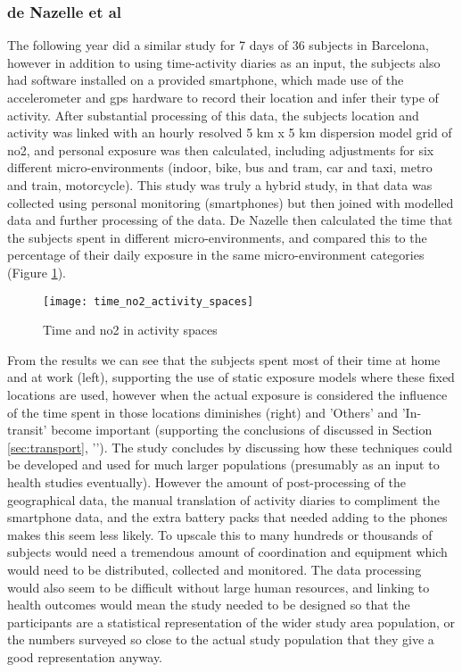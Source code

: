 
\subsubsection{de Nazelle et al}
\label{sec:dynamic_models_denazelle}

The following year \cite{DeNazelle2013} did a similar study for 7 days of 36 subjects in Barcelona, however in addition to using time-activity diaries as an input, the subjects also had software installed on a provided smartphone, which made use of the accelerometer and \gls{gps} hardware to record their location and infer their type of activity. After substantial processing of this data, the subjects location and activity was linked with an hourly resolved 5 km x 5 km dispersion model grid of \gls{no2}, and personal exposure was then calculated, including adjustments for six different micro-environments (indoor, bike, bus and tram, car and taxi, metro and train, motorcycle). This study was truly a hybrid study, in that data was collected using personal monitoring (smartphones) but then joined with modelled data and further processing of the data. De Nazelle then calculated the time that the subjects spent in different micro-environments, and compared this to the percentage of their daily exposure in the same micro-environment categories (Figure \ref{fig:time_no2_activity_spaces}).

\begin{figure}[H]
\centering
\texttt{[image: time\_no2\_activity\_spaces]}
\caption{Time and \gls{no2} in activity spaces}
\label{fig:time_no2_activity_spaces}
\end{figure}

From the results we can see that the subjects spent most of their time at home and at work (left), supporting the use of static exposure models where these fixed locations are used, however when the actual exposure is considered the influence of the time spent in those locations diminishes (right) and 'Others' and 'In-transit' become important (supporting the conclusions of \cite{Dons2011} discussed in Section \ref{sec:transport}, ''). The study concludes by discussing how these techniques could be developed and used for much larger populations (presumably as an input to health studies eventually). However the amount of post-processing of the geographical data, the manual translation of activity diaries to compliment the smartphone data, and the extra battery packs that needed adding to the phones makes this seem less likely. To upscale this to many hundreds or thousands of subjects would need a tremendous amount of coordination and equipment which would need to be distributed, collected and monitored. The data processing would also seem to be difficult without large human resources, and linking to health outcomes would mean the study needed to be designed so that the participants are a statistical representation of the wider study area population, or the numbers surveyed so close to the actual study population that they give a good representation anyway. 


